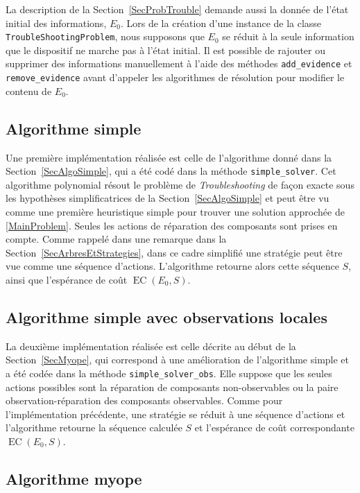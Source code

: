 \documentclass[a4paper,11pt]{article}
\theoremstyle{plain}
\theoremstyle{definition}
\DeclareMathOperator{\EC}{EC}
\begin{document}
La description de la Section~\ref{SecProbTrouble} demande aussi la donnée de l'état initial des informations, $E_0$. Lors de la création d'une instance de la classe \texttt{TroubleShootingProblem}, nous supposons que $E_0$ se réduit à la seule information que le dispositif ne marche pas à l'état initial. Il est possible de rajouter ou supprimer des informations manuellement à l'aide des méthodes \texttt{add\_evidence} et \texttt{remove\_evidence} avant d'appeler les algorithmes de résolution pour modifier le contenu de $E_0$.

\subsection{Algorithme simple}
\label{SecImplAlgoSimple}

Une première implémentation réalisée est celle de l'algorithme donné dans la Section~\ref{SecAlgoSimple}, qui a été codé dans la méthode \texttt{simple\_solver}. Cet algorithme polynomial résout le problème de \emph{Troubleshooting} de façon exacte sous les hypothèses simplificatrices de la Section~\ref{SecAlgoSimple} et peut être vu comme une première heuristique simple pour trouver une solution approchée de \eqref{MainProblem}. Seules les actions de réparation des composants sont prises en compte. Comme rappelé dans une remarque dans la Section~\ref{SecArbresEtStrategies}, dans ce cadre simplifié une stratégie peut être vue comme une séquence d'actions. L'algorithme retourne alors cette séquence $S$, ainsi que l'espérance de coût $\EC(E_0, S)$.

\subsection{Algorithme simple avec observations locales}
\label{SecImplAlgoSimpleObs}

La deuxième implémentation réalisée est celle décrite au début de la Section~\ref{SecMyope}, qui correspond à une amélioration de l'algorithme simple et a été codée dans la méthode \texttt{simple\_solver\_\allowbreak{}obs}. Elle suppose que les seules actions possibles sont la réparation de composants non-ob\-ser\-vables ou la paire observation-réparation des composants observables. Comme pour l'implémentation précédente, une stratégie se réduit à une séquence d'actions et l'algorithme retourne la séquence calculée $S$ et l'espérance de coût correspondante $\EC(E_0, S)$.

\subsection{Algorithme myope}
\label{SecImplMyope}
\end{document}
